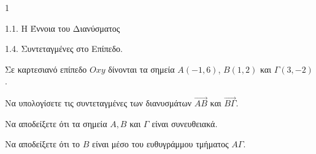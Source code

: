 \begin{ylh}{1}
    \item 1.1. Η Έννοια του Διανύσματος
    \item 1.4. Συντεταγμένες στο Επίπεδο.
\end{ylh}
Σε καρτεσιανό επίπεδο $Oxy$ δίνονται τα σημεία $A(-1, 6)$, $B(1, 2)$ και $\Gamma(3, -2)$.
\begin{alist}
\item Να υπολογίσετε τις συντεταγμένες των διανυσμάτων $\vec{AB}$ και $\vec{B\Gamma}$. 
\item Να αποδείξετε ότι τα σημεία $A, B$ και $\Gamma$ είναι συνευθειακά. 
\item Να αποδείξετε ότι το $B$ είναι μέσο του ευθυγράμμου τμήματος $A\Gamma$. 
\end{alist}